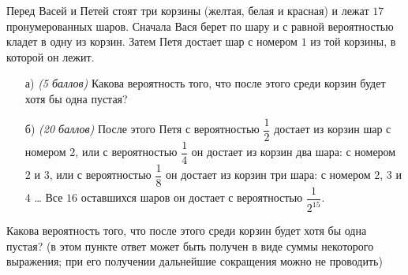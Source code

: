 
Перед Васей и Петей стоят три корзины (желтая, белая и красная) 
	и лежат $17$ пронумерованных шаров. Сначала Вася берет по шару
	и с равной вероятностью кладет в одну из корзин. 
	Затем Петя достает шар с номером $1$ из той корзины, в которой он лежит. 
	 
	\begin{enumerate}
	\item[а)] \textit{(5 баллов)} Какова вероятность того, что после этого
	среди корзин будет хотя бы одна пустая?
	\item[б)] \textit{(20 баллов)} После этого Петя с вероятностью $\dfrac{1}{2}$
	достает из корзин шар с номером $2$, или с вероятностью $\dfrac{1}{4}$
	он достает из корзин два шара: с номером $2$ и $3$, или с вероятностью
	$\dfrac{1}{8}$ он достает из корзин три шара: с номером $2$, $3$ и $4$ \dots
	Все $16$ оставшихся шаров он достает с вероятностью $\dfrac{1}{2^{15}}$.
	\end{enumerate}
	 Какова вероятность того, что после этого
	среди корзин будет хотя бы одна пустая?
	(в этом пункте ответ может быть получен в виде суммы 
	некоторого выражения; при его получении дальнейшие 
	сокращения можно не проводить)
